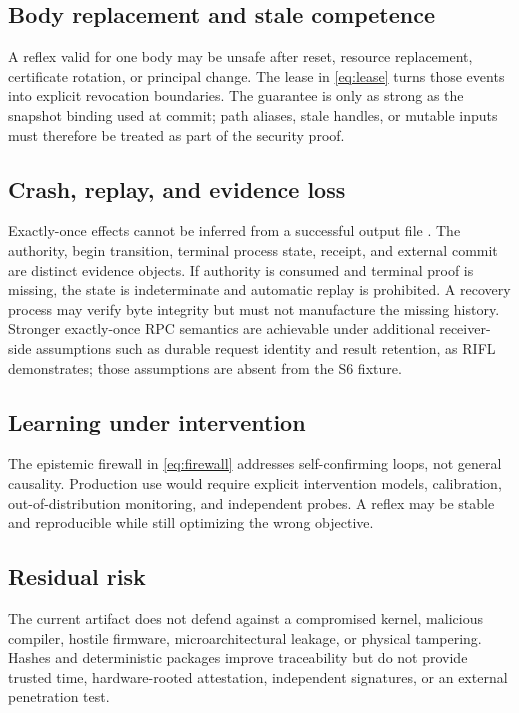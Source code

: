 \documentclass[journal,10pt]{IEEEtran}
\begin{document}
\subsection{Body replacement and stale competence}
A reflex valid for one body may be unsafe after reset, resource replacement, certificate rotation, or principal change. The lease in \eqref{eq:lease} turns those events into explicit revocation boundaries. The guarantee is only as strong as the snapshot binding used at commit; path aliases, stale handles, or mutable inputs must therefore be treated as part of the security proof.

\subsection{Crash, replay, and evidence loss}
Exactly-once effects cannot be inferred from a successful output file \cite{kafkaDelivery,flinkGuarantees,lee2015rifl,liu2023unum}. The authority, begin transition, terminal process state, receipt, and external commit are distinct evidence objects. If authority is consumed and terminal proof is missing, the state is indeterminate and automatic replay is prohibited. A recovery process may verify byte integrity but must not manufacture the missing history. Stronger exactly-once RPC semantics are achievable under additional receiver-side assumptions such as durable request identity and result retention, as RIFL demonstrates; those assumptions are absent from the S6 fixture.

\subsection{Learning under intervention}
The epistemic firewall in \eqref{eq:firewall} addresses self-confirming loops, not general causality. Production use would require explicit intervention models, calibration, out-of-distribution monitoring, and independent probes. A reflex may be stable and reproducible while still optimizing the wrong objective.

\subsection{Residual risk}
The current artifact does not defend against a compromised kernel, malicious compiler, hostile firmware, microarchitectural leakage, or physical tampering. Hashes and deterministic packages improve traceability but do not provide trusted time, hardware-rooted attestation, independent signatures, or an external penetration test.
\end{document}
